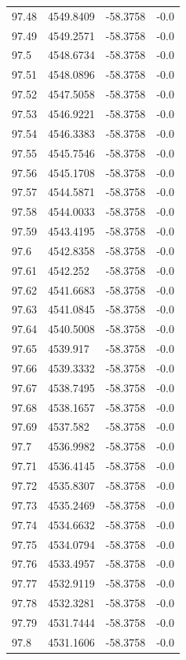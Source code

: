 \begin{table}[H]
\begin{tabular}{llll}
97.48 & 4549.8409 & -58.3758 & -0.0 \\
97.49 & 4549.2571 & -58.3758 & -0.0 \\
97.5 & 4548.6734 & -58.3758 & -0.0 \\
97.51 & 4548.0896 & -58.3758 & -0.0 \\
97.52 & 4547.5058 & -58.3758 & -0.0 \\
97.53 & 4546.9221 & -58.3758 & -0.0 \\
97.54 & 4546.3383 & -58.3758 & -0.0 \\
97.55 & 4545.7546 & -58.3758 & -0.0 \\
97.56 & 4545.1708 & -58.3758 & -0.0 \\
97.57 & 4544.5871 & -58.3758 & -0.0 \\
97.58 & 4544.0033 & -58.3758 & -0.0 \\
97.59 & 4543.4195 & -58.3758 & -0.0 \\
97.6 & 4542.8358 & -58.3758 & -0.0 \\
97.61 & 4542.252 & -58.3758 & -0.0 \\
97.62 & 4541.6683 & -58.3758 & -0.0 \\
97.63 & 4541.0845 & -58.3758 & -0.0 \\
97.64 & 4540.5008 & -58.3758 & -0.0 \\
97.65 & 4539.917 & -58.3758 & -0.0 \\
97.66 & 4539.3332 & -58.3758 & -0.0 \\
97.67 & 4538.7495 & -58.3758 & -0.0 \\
97.68 & 4538.1657 & -58.3758 & -0.0 \\
97.69 & 4537.582 & -58.3758 & -0.0 \\
97.7 & 4536.9982 & -58.3758 & -0.0 \\
97.71 & 4536.4145 & -58.3758 & -0.0 \\
97.72 & 4535.8307 & -58.3758 & -0.0 \\
97.73 & 4535.2469 & -58.3758 & -0.0 \\
97.74 & 4534.6632 & -58.3758 & -0.0 \\
97.75 & 4534.0794 & -58.3758 & -0.0 \\
97.76 & 4533.4957 & -58.3758 & -0.0 \\
97.77 & 4532.9119 & -58.3758 & -0.0 \\
97.78 & 4532.3281 & -58.3758 & -0.0 \\
97.79 & 4531.7444 & -58.3758 & -0.0 \\
97.8 & 4531.1606 & -58.3758 & -0.0 \\

\end{tabular}
\end{table}
